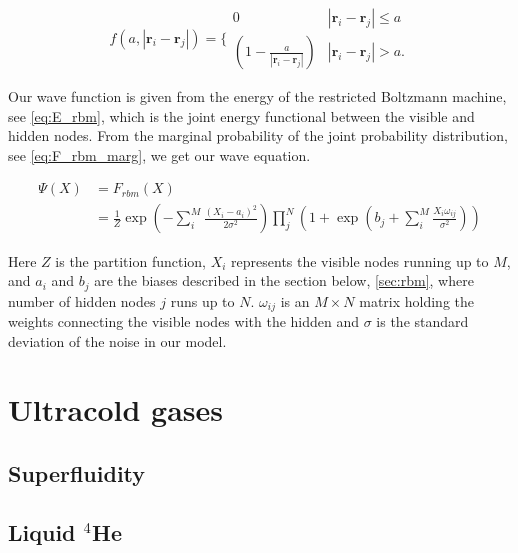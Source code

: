 \begin{equation} \label{eq:jastrow_f}
    f(a,|\mathbf{r}_i-\mathbf{r}_j|)=\Bigg\{
 \begin{array}{ll}
	 0 & {|\mathbf{r}_i-\mathbf{r}_j|} \leq {a}\\
	 (1-\frac{a}{|\mathbf{r}_i-\mathbf{r}_j|}) & {|\mathbf{r}_i-\mathbf{r}_j|} > {a}.
 \end{array}
\end{equation}

Our wave function is given from the energy of the restricted Boltzmann machine, see \eqref{eq:E_rbm}, which is the joint energy functional between the visible and hidden nodes. From the marginal probability of the joint probability distribution, see \eqref{eq:F_rbm_marg}, we get our wave equation.                     

\begin{align}\label{eq:F_rbm}
\Psi(X) &= F_{rbm}(X) \\
&= \frac{1}{Z} \exp \left( -\sum_{i}^{M} \frac{(X_i - a_i)^2}{2 \sigma^2} \right) \prod_{j}^{N} \left( 1 + \exp \left( b_j + \sum_{i}^{M} \frac{X_i \omega_{ij}}{\sigma^2} \right) \right)
\end{align}

Here $Z$ is the partition function, $X_i$ represents the visible nodes running up to $M$, and $a_i$ and $b_j$ are the biases described in the section below, \eqref{sec:rbm}, where number of hidden nodes $j$ runs up to $N$. 
$\omega_{ij}$ is an $M \times N$ matrix holding the weights connecting the visible nodes with the hidden and $\sigma$ is the standard deviation of the noise in our model. \\

\section{Ultracold gases}

\subsection{Superfluidity}

\subsection{}

\subsection{Liquid $^4$He}

